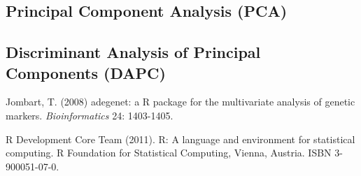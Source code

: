 \documentclass{article}
\begin{document}
\subsection{Principal Component Analysis (PCA)}




\subsection{Discriminant Analysis of Principal Components (DAPC)}







\begin{thebibliography}{9}

  Jombart, T. (2008) adegenet: a R package for the multivariate
  analysis of genetic markers. \textit{Bioinformatics} 24: 1403-1405.

  R Development Core Team (2011). R: A language and environment for
  statistical computing. R Foundation for Statistical Computing,
  Vienna, Austria. ISBN 3-900051-07-0.

\end{thebibliography}
\end{document}
